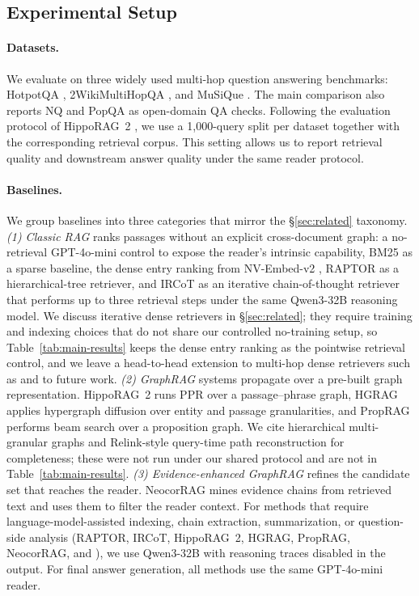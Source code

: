 \subsection{Experimental Setup}
\label{sec:experiments:setup}

\paragraph{Datasets.}
We evaluate on three widely used multi-hop question answering
benchmarks: HotpotQA \citep{yang2018hotpotqa}, 2WikiMultiHopQA
\citep{ho2020constructing}, and MuSiQue \citep{trivedi2022musique}.
The main comparison also reports NQ and PopQA as open-domain QA checks.
Following the evaluation protocol of HippoRAG~2
\citep{gutierrez2025hipporag}, we use a 1{,}000-query split per dataset
together with the corresponding retrieval corpus. This setting allows
us to report retrieval quality and downstream answer quality under the
same reader protocol.

\paragraph{Baselines.}
We group baselines into three categories that mirror the
\S\ref{sec:related} taxonomy.
\emph{(1) Classic RAG} ranks passages without an explicit
cross-document graph: a no-retrieval GPT-4o-mini control to expose
the reader's intrinsic capability, BM25 \citep{robertson2009bm25}
as a sparse baseline, the dense entry ranking from NV-Embed-v2
\citep{lee2025nvembed}, RAPTOR \citep{sarthi2024raptor} as a
hierarchical-tree retriever, and IRCoT \citep{trivedi2023ircot} as
an iterative chain-of-thought retriever that performs up to three
retrieval steps under the same Qwen3-32B reasoning model. We
discuss iterative dense retrievers in \S\ref{sec:related}; they
require training and indexing choices that do not share our
controlled no-training setup, so Table~\ref{tab:main-results}
keeps the dense entry ranking as the pointwise retrieval control,
and we leave a head-to-head extension to multi-hop dense
retrievers such as \citet{xiong2021mdr} and \citet{zhao2021beamdr}
to future work.
\emph{(2) GraphRAG} systems propagate over a pre-built graph
representation. HippoRAG~2 \citep{gutierrez2025hipporag} runs PPR
over a passage--phrase graph, HGRAG \citep{hgrag2024} applies
hypergraph diffusion over entity and passage granularities, and
PropRAG \citep{wang2025proprag} performs beam search over a
proposition graph. We cite hierarchical multi-granular graphs
\citep{hu2026mgrangrag} and Relink-style query-time path
reconstruction \citep{huang2026relink} for completeness; these
were not run under our shared protocol and are not in
Table~\ref{tab:main-results}.
\emph{(3) Evidence-enhanced GraphRAG} refines the candidate set
that reaches the reader. NeocorRAG \citep{peng2026neocorrag} mines
evidence chains from retrieved text and uses them to filter the
reader context.
For methods that require language-model-assisted indexing, chain
extraction, summarization, or question-side analysis (RAPTOR,
IRCoT, HippoRAG~2, HGRAG, PropRAG, NeocorRAG, and \methodname{}),
we use Qwen3-32B with reasoning traces disabled in the output. For
final answer generation, all methods use the same GPT-4o-mini
reader.

